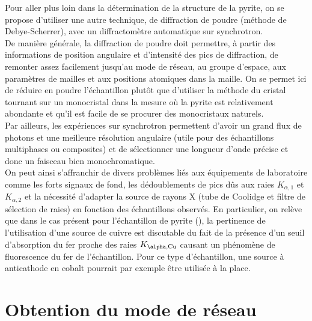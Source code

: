 Pour aller plus loin dans la détermination de la structure de la pyrite, on se propose d'utiliser une autre technique, de diffraction de poudre (méthode de Debye-Scherrer), avec un diffractomètre automatique sur synchrotron.\\
De manière générale, la diffraction de poudre doit permettre, à partir des informations de position angulaire et d'intensité des pics de diffraction, de remonter assez facilement jusqu'au mode de réseau, au groupe d'espace, aux paramètres de mailles et aux positions atomiques dans la maille.
On se permet ici de réduire en poudre l'échantillon plutôt que d'utiliser la méthode du cristal tournant sur un monocristal dans la mesure où la pyrite est relativement abondante et qu'il est facile de se procurer des monocristaux naturels.\\
Par ailleurs, les expériences sur synchrotron permettent d'avoir un grand flux de photons et une meilleure résolution angulaire (utile pour des échantillons multiphases ou composites) et de sélectionner une longueur d'onde précise et donc un faisceau bien monochromatique.\\
On peut ainsi s'affranchir de divers problèmes liés aux équipements de laboratoire comme les forts signaux de fond, les dédoublements de pics dûs aux raies \(K_{\alpha,1}\) et \(K_{\alpha,2}\) et la nécessité d'adapter la source de rayons X (tube de Coolidge et filtre de sélection de raies) en fonction des échantillons observés.
En particulier, on relève que dans le cas présent pour l'échantillon de pyrite (), la pertinence de l'utilisation d'une source de cuivre  est discutable du fait de la présence d'un seuil d'absorption du fer proche des raies \(K_{\alpha,\ce{Cu}}\) causant un phénomène de fluorescence du fer de l'échantillon.
Pour ce type d'échantillon, une source à anticathode en cobalt  pourrait par exemple être utilisée à la place.

\section{Obtention du mode de réseau}

